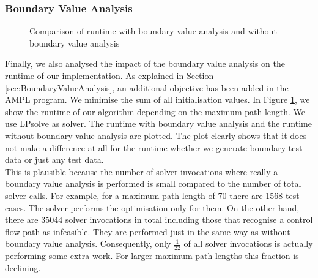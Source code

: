 \documentclass[runningheads,a4paper]{llncs}%
\begin{document}
\subsubsection{Boundary Value Analysis}
\label{sec:caseStudyBoundaryValues}
\begin{figure}
\begin{center}
%
\end{center}
\caption{Comparison of runtime with boundary value analysis and without boundary value analysis}
\label{fig:RuntimeBoundaryValue}
\end{figure}
Finally, we also analysed the impact of the boundary value analysis on the runtime of our implementation. As explained in Section \ref{sec:BoundaryValueAnalysis}, an additional objective has been added in the AMPL program. We minimise the sum of all initialisation values. In Figure \ref{fig:RuntimeBoundaryValue}, we show the runtime of our algorithm depending on the maximum path length. We use LPsolve as solver. The runtime with boundary value analysis and the runtime without boundary value analysis are plotted. The plot clearly shows that it does not make a difference at all for the runtime whether we generate boundary test data or just any test data.\\
This is plausible because the number of solver invocations where really a boundary value analysis is performed is small compared to the number of total solver calls. For example, for a maximum path length of 70 there are 1568 test cases. The solver performs the optimisation only for them. On the other hand, there are 35044 solver invocations in total including those that recognise a control flow path as infeasible. They are performed just in the same way as without boundary value analysis. Consequently, only $\frac{1}{22}$ of all solver invocations is actually performing some extra work. For larger maximum path lengths this fraction is declining.\\
\end{document}
